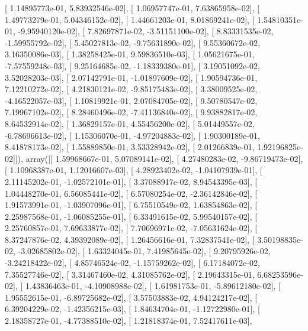 \documentclass{article}
\begin{document}
       [  1.14895773e-01,   5.83932546e-02],
       [  1.06957747e-01,   7.63865958e-02],
       [  1.49773279e-01,   5.04346152e-02],
       [  1.44661203e-01,   8.01869241e-02],
       [  1.54810351e-01,  -9.95940120e-02],
       [  7.82697871e-02,  -3.51151100e-02],
       [  8.83331535e-02,  -1.59955792e-02],
       [  5.45027813e-02,  -9.75631890e-02],
       [  9.55360672e-02,   3.16350086e-03],
       [  1.38258425e-01,   9.59836510e-03],
       [  1.05621675e-01,  -7.57559248e-03],
       [  9.25164685e-02,  -1.18339380e-01],
       [  3.19051092e-02,   3.52028203e-03],
       [  2.07142791e-01,  -1.01897609e-02],
       [  1.90594736e-01,   7.12210272e-02],
       [  4.21830121e-02,  -9.85175483e-02],
       [  3.38009525e-02,  -4.16522057e-03],
       [  1.10819921e-01,   2.07084705e-02],
       [  9.50780547e-02,   7.19967102e-02],
       [  8.28460496e-02,  -7.41136840e-02],
       [  9.93882817e-02,   8.64532914e-02],
       [  1.36829157e-01,   4.55456200e-02],
       [  5.01449557e-02,  -6.78696613e-02],
       [  1.15306070e-01,  -4.97204883e-02],
       [  1.90300189e-01,   8.41878173e-02],
       [  1.55889850e-01,   3.53328942e-02],
       [  2.01266839e-01,   1.92196825e-02]]), array([[  1.59968667e-01,   5.07089141e-02],
       [  4.27480283e-02,  -9.86719473e-02],
       [  1.10968387e-01,   1.12016607e-03],
       [  4.28923402e-02,  -1.04107939e-01],
       [  2.11145202e-01,  -1.02572101e-01],
       [  3.37088917e-02,   8.94543395e-03],
       [  1.04448270e-01,   6.56085441e-02],
       [  6.57080254e-02,  -2.36142846e-02],
       [  1.91573991e-01,  -1.03907096e-01],
       [  6.75510549e-02,   1.63854863e-02],
       [  2.25987568e-01,  -1.06085255e-01],
       [  6.33491615e-02,   5.99540157e-02],
       [  2.25760857e-01,   7.69633877e-02],
       [  7.70696971e-02,  -7.05631624e-02],
       [  8.37247876e-02,   4.39392089e-02],
       [  1.26456616e-01,   7.32837541e-02],
       [  3.50198835e-02,  -3.02685802e-02],
       [  1.63324045e-01,   7.41985645e-02],
       [  9.20795926e-02,  -3.24218422e-02],
       [  4.85746524e-02,  -1.15759262e-02],
       [  6.17184072e-02,   7.35527746e-02],
       [  3.31467460e-02,   4.31085762e-02],
       [  2.19643315e-01,   6.68253596e-02],
       [  1.43836463e-01,  -4.10908988e-02],
       [  1.61981753e-01,  -5.89612180e-02],
       [  1.95552615e-01,  -6.89725682e-02],
       [  3.57503883e-02,   4.94124217e-02],
       [  6.39204229e-02,  -1.42356215e-03],
       [  1.84634704e-01,  -1.12722980e-01],
       [  2.18358727e-01,  -4.77388510e-02],
       [  1.21818374e-01,   7.52417611e-03],
\end{document}
